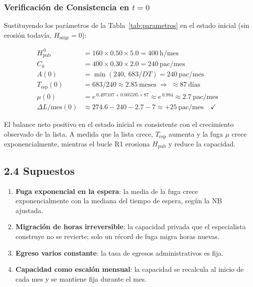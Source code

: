 \documentclass[12pt,a4paper]{article}
\begin{document}
\subsubsection*{Verificación de Consistencia en $t=0$}

Sustituyendo los parámetros de la Tabla~\ref{tab:parametros} en el estado inicial (sin erosión todavía, $H_{\text{migr}}=0$):

\begin{align*}
H_{\text{pub}}^{\,0} &= 160 \times 0.50 \times 5.0 = 400\ \text{h/mes}\\
C_0 &= 400 \times 0.30 \times 2.0 = 240\ \text{pac/mes}\\
A(0) &= \min(240,\ 683/DT) = 240\ \text{pac/mes}\\
T_{\text{esp}}(0) &= 683 / 240 \approx 2.85\ \text{meses} \;\Rightarrow\; \approx 87\ \text{días}\\
\mu(0) &= e^{\,0.497107 + 0.005595 \times 87} \approx e^{\,0.984} \approx 2.7\ \text{pac/mes}\\
\Delta L/\text{mes}(0) &\approx 274.6 - 240 - 2.7 - 7 \approx +25\ \text{pac/mes} \quad \checkmark
\end{align*}

El balance neto positivo en el estado inicial es consistente con el crecimiento observado de la lista. A medida que la lista crece, $T_{\text{esp}}$ aumenta y la fuga $\mu$ crece exponencialmente, mientras el bucle R1 erosiona $H_{\text{pub}}$ y reduce la capacidad.

\subsection*{2.4 Supuestos}

\begin{enumerate}[leftmargin=1.5cm,label=\textbf{S\arabic*.}]

  \item \textbf{Fuga exponencial en la espera}: la media de la fuga crece exponencialmente con la mediana del tiempo de espera, según la NB ajustada. 

  \item \textbf{Migración de horas irreversible}: la capacidad privada que el especialista construye no se revierte; solo un récord de fuga migra horas nuevas.
  
  \item \textbf{Egreso varios constante}: la tasa de egresos administrativos es fija. 
  
  \item \textbf{Capacidad como escalón mensual}: la capacidad se recalcula al inicio de cada mes y se mantiene fija durante el mes. 
\end{enumerate}
\end{document}
